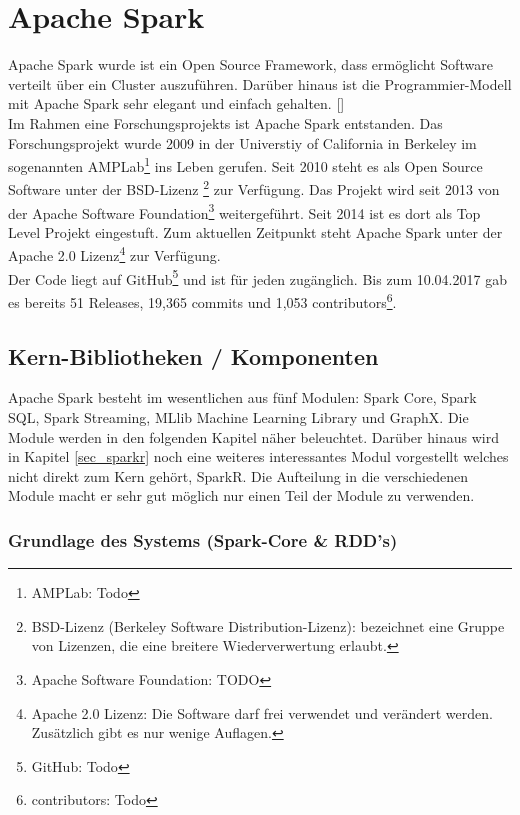 \newpage
\chapter{Apache Spark} 

Apache Spark wurde ist ein Open Source Framework, dass ermöglicht Software verteilt \"uber ein Cluster auszuführen. Dar\"uber hinaus ist die Programmier-Modell mit Apache Spark sehr elegant und einfach gehalten. [\cite{AAWS15}] \\
Im Rahmen eine Forschungsprojekts ist Apache Spark entstanden. Das Forschungsprojekt wurde 2009 in der Universtiy of California in Berkeley im sogenannten AMPLab\footnote{AMPLab: Todo} ins Leben gerufen. Seit 2010 steht es als Open Source Software unter der BSD-Lizenz \footnote{BSD-Lizenz (Berkeley Software Distribution-Lizenz): bezeichnet eine Gruppe von Lizenzen, die eine breitere Wiederverwertung erlaubt.} zur Verfügung. Das Projekt wird seit 2013 von der Apache Software Foundation\footnote{Apache Software Foundation: TODO} weitergef\"uhrt. Seit 2014 ist es dort als Top Level Projekt eingestuft. Zum aktuellen Zeitpunkt steht Apache Spark unter der Apache 2.0 Lizenz\footnote{Apache 2.0 Lizenz: Die Software darf frei verwendet und ver\"andert werden. Zus\"atzlich gibt es nur wenige Auflagen.} zur Verf\"ugung. \\
Der Code liegt auf GitHub\footnote{GitHub: Todo } und ist f\"ur jeden zug\"anglich. Bis zum 10.04.2017 gab es bereits 51 Releases, 19,365 commits und 1,053 contributors\footnote{contributors: Todo }.


\section{Kern-Bibliotheken / Komponenten}

Apache Spark besteht im wesentlichen aus f\"unf Modulen: Spark Core, Spark SQL, Spark Streaming, MLlib Machine Learning Library und GraphX. 
Die Module werden in den folgenden Kapitel n\"aher beleuchtet. 
Dar\"uber hinaus wird in Kapitel \ref{sec_sparkr} noch eine weiteres interessantes Modul vorgestellt welches nicht direkt zum Kern geh\"ort, SparkR.
Die Aufteilung in die verschiedenen Module macht er sehr gut möglich nur einen Teil der Module zu verwenden. 

\newpage
\subsection{Grundlage des Systems (Spark-Core \& RDD’s)}\label{sec_sparkcore}

